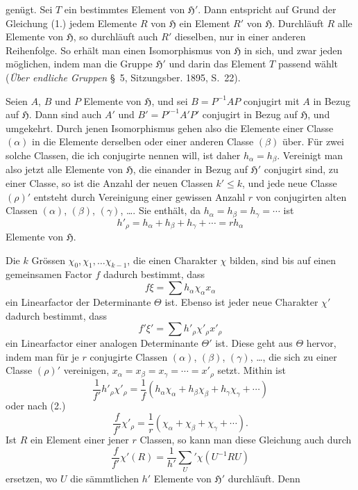 \documentclass[11pt]{article}
\newcommand{\grp}{\mathfrak{H}}
\begin{document}
genügt. Sei $T$ ein bestimmtes Element von $\grp'$. Dann entspricht auf Grund der Gleichung (1.) jedem Elemente $R$ von $\grp$ ein Element $R'$ von $\grp$. Durchläuft $R$ alle Elemente von $\grp$, so durchläuft auch $R'$ dieselben, nur in einer anderen Reihenfolge. So erhält man einen Isomorphismus von $\grp$ in sich, und zwar jeden möglichen, indem man die Gruppe $\grp'$ und darin das Element $T$ passend wählt (\emph{Über endliche Gruppen} \S~5, Sitzungsber. 1895, S.~22).

Seien $A$, $B$ und $P$ Elemente von $\grp$, und sei $B=P^{-1}AP$ conjugirt mit $A$ in Bezug auf $\grp$. Dann sind auch $A'$ und $B'=P'^{-1}A'P'$ conjugirt in Bezug auf $\grp$, und umgekehrt. Durch jenen Isomorphismus gehen also die Elemente einer Classe $(\alpha)$ in die Elemente derselben oder einer anderen Classe $(\beta)$ über. Für zwei solche Classen, die ich conjugirte nennen will, ist daher $h_\alpha=h_\beta$. Vereinigt man also jetzt alle Elemente von $\grp$, die einander in Bezug auf $\grp'$ conjugirt sind, zu einer Classe, so ist die Anzahl der neuen Classen $k'\le k$, und jede neue Classe $(\rho)'$ entsteht durch Vereinigung einer gewissen Anzahl $r$ von conjugirten alten Classen $(\alpha)$, $(\beta)$, $(\gamma)$, \ldots. Sie enthält, da $h_\alpha=h_\beta=h_\gamma=\cdots$ ist
\begin{equation*}\tag{2.}
h'_\rho=h_\alpha+h_\beta+h_\gamma+\cdots=rh_\alpha
\end{equation*}
Elemente von $\grp$.

Die $k$ Grössen $\chi_0,\chi_1,\ldots \chi_{k-1}$, die einen Charakter $\chi$ bilden, sind bis auf einen gemeinsamen Factor $f$ dadurch bestimmt, dass
\begin{equation*}\tag{3.}
f\xi=\sum h_\alpha\chi_\alpha x_\alpha
\end{equation*}
ein Linearfactor der Determinante $\Theta$ ist. Ebenso ist jeder neue Charakter $\chi'$ dadurch bestimmt, dass
\[
f'\xi'=\sum h'_\rho\chi'_\rho x'_\rho
\]
ein Linearfactor einer analogen Determinante $\Theta'$ ist. Diese geht aus $\Theta$ hervor, indem man für je $r$ conjugirte Classen $(\alpha)$, $(\beta)$, $(\gamma)$, \ldots, die sich zu einer Classe $(\rho)'$ vereinigen, $x_\alpha=x_\beta=x_\gamma=\cdots=x'_\rho$ setzt. Mithin ist
\[
\frac{1}{f'}h'_\rho\chi'_\rho=\frac{1}{f}(h_\alpha\chi_\alpha+h_\beta\chi_\beta+h_\gamma\chi_\gamma+\cdots)
\]
oder nach (2.)
\begin{equation*}\tag{4.}
\frac{f}{f'}\chi'_\rho=\frac{1}{r}(\chi_\alpha+\chi_\beta+\chi_\gamma+\cdots).
\end{equation*}
Ist $R$ ein Element einer jener $r$ Classen, so kann man diese Gleichung auch durch
\begin{equation*}\tag{5.}
\frac{f}{f'}\chi'(R)=\frac{1}{h'}\sum_U'\chi(U^{-1}RU)
\end{equation*}
ersetzen, wo $U$ die sämmtlichen $h'$ Elemente von $\grp'$ durchläuft. Denn
\end{document}
